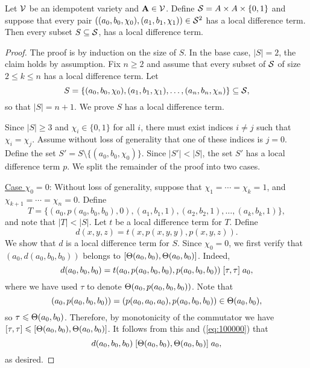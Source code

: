 \begin{thm} %
  \label{thm:local-diff-terms}
  Let $\mathcal{V}$ be an idempotent variety and
  $\mathbf{A} \in \mathcal{V}$. Define
  $\mathcal{S}= A \times A \times \{0,1\}$
  and suppose that every pair
  $((a_0, b_0, \chi_0), (a_1, b_1, \chi_1)) \in \mathcal{S}^2$
  has a local difference term.
  Then every subset $S \subseteq \mathcal{S}$,
  has a local difference term.
\end{thm}
\begin{proof}
The proof is by induction on the size of $S$.  In the base case, $|S| = 2$,
the claim holds by assumption.
Fix $n\geq 2$ and assume that every subset of $\mathcal{S}$ of size $2\leq k \leq n$ has a local
difference term. Let
\[
S = \{(a_0, b_0, \chi_0), (a_1, b_1, \chi_1), \dots, (a_{n}, b_{n},\chi_{n})\} \subseteq \mathcal{S},\]
so that $|S| = n+1$.  We prove $S$ has a local difference term.

Since $|S| \geq 3$ and $\chi_i \in \{0,1\}$ for all $i$, there must exist
indices $i\neq j$ such that $\chi_i = \chi_j$. Assume without loss of generality
that one of these indices is $j=0$.  Define
the set
$S' = S \setminus \{(a_0, b_0, \chi_0)\}$.
Since $|S'| < |S|$, the set $S'$ has a local difference term $p$.
We split the remainder of the proof into two cases.

\vskip3mm

\noindent \underline{Case $\chi_0 = 0$}:
Without loss of generality, suppose that $\chi_1 = %
\cdots =\chi_k = 1$,
and $\chi_{k+1} %
= \cdots = \chi_{n} = 0$. Define %
\[T = \{(a_0, p(a_0, b_0, b_0), 0),
(a_1, b_1, 1), (a_2, b_2, 1), 
\dots, (a_k, b_k, 1)\},\] and 
note that $|T| < |S|$.
Let $t$ be a local difference term for $T$.
Define
\[
d(x,y,z) = t(x, p(x,y,y), p(x,y,z)).
\]
We show that $d$ is a local difference term for $S$.
Since $\chi_0 =0$, we first verify that
$(a_0, d(a_0,b_0,b_0))$ belongs to $\mathrel{[\Theta(a_0,b_0), \Theta(a_0,b_0)]}$.
Indeed,
\begin{equation}
    \label{eq:100000}
  d(a_0,b_0,b_0) =
  t(a_0, p(a_0,b_0,b_0), p(a_0,b_0,b_0))\comm{\tau}{\tau} a_0,
\end{equation}
where we have used $\tau$ to denote $\Theta(a_0, p(a_0,b_0,b_0))$.
Note that
\[(a_0, p(a_0,b_0,b_0)) = (p(a_0,a_0,a_0), p(a_0,b_0,b_0)) \in \Theta(a_0, b_0),\]
so $\tau\leqslant \Theta(a_0,b_0)$. Therefore,
by monotonicity of the commutator we have
$\mathrel{[\tau, \tau]} {\leqslant} \mathrel{[\Theta(a_0,b_0), \Theta(a_0,b_0)]}$.
It follows from this and (\ref{eq:100000}) that
\[d(a_0,b_0,b_0)\mathrel{[\Theta(a_0,b_0), \Theta(a_0,b_0)]} a_0,\]
as desired.


\end{proof}
